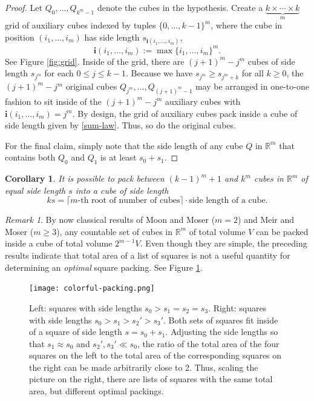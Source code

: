 \documentclass[12pt]{amsart}
\newtheorem{corollary}[theorem]{Corollary}
\theoremstyle{definition}
\theoremstyle{remark}
\newtheorem{remark}[theorem]{Remark}
\newcommand{\RR}{\mathbb{R}}
\numberwithin{figure}{section}
\numberwithin{equation}{section}
\begin{document}
\begin{proof} Let $Q_0,\dots, Q_{k^m-1}$ denote the cubes in the hypothesis. Create a $\underbrace{k\times\cdots\times k}_m$ grid of auxiliary cubes indexed by tuples $\{0,\dots,k-1\}^m$, where the cube in position $(i_1,\dots,i_m)$ has side length $s_{\mathbf{i}(i_1,\dots,i_m)}$, \begin{equation}\mathbf{i}(i_1,\dots,i_m):=\max\{i_1,\dots,i_m\}^m.\end{equation} See Figure \ref{fig:grid}. Inside of the grid, there are $(j+1)^m-j^m$ cubes of side length $s_{j^m}$ for each $0\leq j\leq k-1$. Because we have $s_{j^m}\geq s_{j^m+k}$ for all $k\geq 0$, the $(j+1)^m-j^m$ original cubes $Q_{j^m},\dots, Q_{(j+1)^m-1}$ may be arranged in one-to-one fashion to sit inside of the $(j+1)^m-j^m$ auxiliary cubes with $\mathbf{i}(i_1,\dots,i_m)=j^m$. By design, the grid of auxiliary cubes pack inside a cube of side length given by \eqref{sum-law}. Thus, so do the original cubes.

For the final claim, simply note that the side length of any cube $Q$ in $\RR^m$ that contains both $Q_0$ and $Q_1$ is at least $s_0+s_1$.
\end{proof}

\begin{corollary}\label{c-packing} It is possible to pack between $(k-1)^m+1$ and $k^m$ cubes in $\RR^m$ of equal side length $s$ into a cube of side length \begin{equation}\label{root-law} ks=\lceil\text{$m$-th root of number of cubes}\rceil\cdot \text{side length of a cube}.\end{equation}\end{corollary}

\begin{remark} By now classical results of Moon and Moser \cite{Moon-Moser} ($m=2$) and Meir and Moser \cite{Meir-Moser} ($m\geq 3$), any countable set of cubes in $\RR^m$ of total volume $V$ can be packed inside a cube of total volume $2^{m-1}V$. Even though they are simple, the preceding results indicate that total area of a list of squares is not a useful quantity for determining an \emph{optimal} square packing. See Figure \ref{fig:packing}.%
\begin{figure}\begin{center}\texttt{[image: colorful-packing.png]}\end{center}\caption{Left: squares with side lengths $s_0>s_1=s_2=s_3$. Right: squares with side lengths $s_0>s_1>s_2'>s_3'$. Both sets of squares fit inside of a square of side length $s=s_0+s_1$. Adjusting the side lengths so that $s_1\approx s_0$ and $s_2',s_3'\ll s_0$, the ratio of the total area of the four squares on the left to the total area of the corresponding squares on the right can be made arbitrarily close to 2. Thus, scaling the picture on the right, there are lists of squares with the same total area, but different optimal packings.}\label{fig:packing}\end{figure}%
\end{remark}
\end{document}
